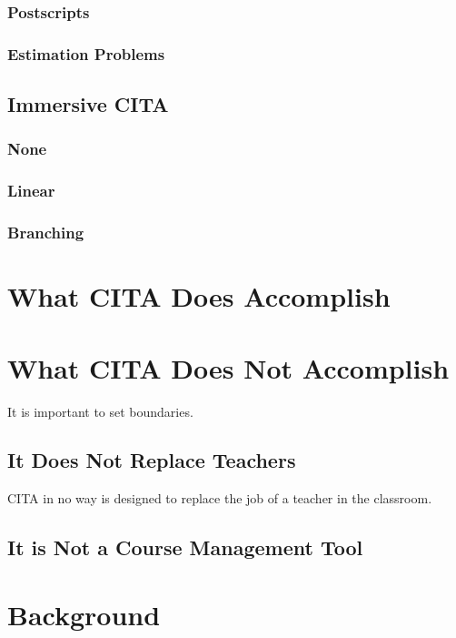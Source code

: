 
\subsubsection{Postscripts}


\subsubsection{Estimation Problems}

\subsection{Immersive CITA}
\subsubsection{None}
\subsubsection{Linear}
\subsubsection{Branching}

\section{What CITA Does Accomplish}

\section{What CITA Does Not Accomplish}

It is important to set boundaries.

\subsection{It Does Not Replace Teachers}

CITA in no way is designed to replace the job of a teacher in the classroom.

\subsection{It is Not a Course Management Tool}



\section{Background}

